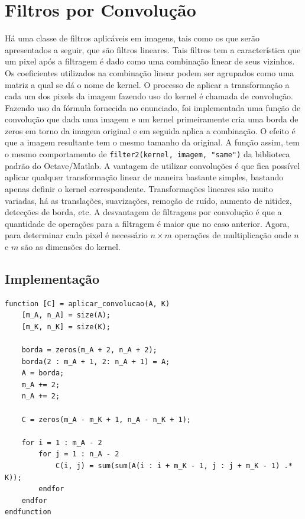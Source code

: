 \documentclass[brazil,times]{abnt}
\begin{document}
	\section{Filtros por Convolução}
		Há uma classe de filtros aplicáveis em imagens, tais como os que serão apresentados a seguir, que são filtros lineares. Tais filtros tem a característica que um pixel após a filtragem é dado como uma combinação linear de seus vizinhos. Os coeficientes utilizados na combinação linear podem ser agrupados como uma matriz a qual se dá o nome de kernel. 
		O processo de aplicar a transformação a cada um dos pixels da imagem fazendo uso do kernel é chamada de convolução. Fazendo uso da fórmula fornecida no enunciado, foi implementada uma função de convolução que dada uma imagem e um kernel primeiramente cria uma borda de zeros em torno da imagem original e em seguida aplica a combinação. O efeito é que a imagem resultante tem o mesmo tamanho da original. A função assim, tem o mesmo comportamento de \texttt{filter2(kernel, imagem, "same")} da biblioteca padrão do Octave/Matlab.
		A vantagem de utilizar convoluções é que fica possível aplicar qualquer transformação linear de maneira bastante simples, bastando apenas definir o kernel correspondente. Transformações lineares são muito variadas, há as translações, suavizações, remoção de ruído, aumento de nitidez, detecções de borda, etc.
		A desvantagem de filtragens por convolução é que a quantidade de operações para a filtragem é maior que no caso anterior. Agora, para determinar cada pixel é necessário $n \times m$ operações de multiplicação onde $n$ e $m$ são as dimensões do kernel.
		
		\subsection{Implementação}
\begin{lstlisting}
function [C] = aplicar_convolucao(A, K)
    [m_A, n_A] = size(A);
    [m_K, n_K] = size(K);
	
	borda = zeros(m_A + 2, n_A + 2);
	borda(2 : m_A + 1, 2: n_A + 1) = A;
	A = borda;
	m_A += 2;
	n_A += 2;
	
    C = zeros(m_A - m_K + 1, n_A - n_K + 1);

    for i = 1 : m_A - 2
        for j = 1 : n_A - 2
            C(i, j) = sum(sum(A(i : i + m_K - 1, j : j + m_K - 1) .* K));
        endfor
    endfor
endfunction

\end{lstlisting}
\end{document}
